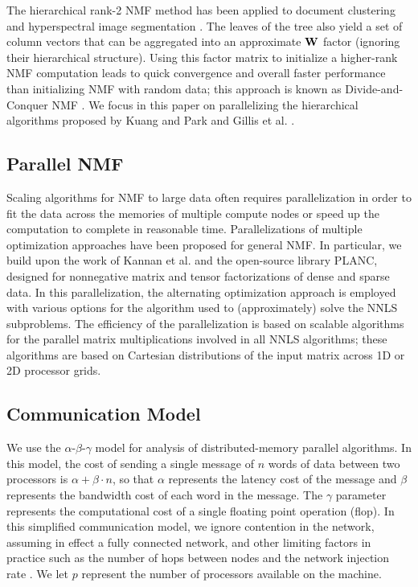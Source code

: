 \documentclass[conference,compsoc]{IEEEtran}
\begin{document}
The hierarchical rank-2 NMF method has been applied to document clustering \cite{KP13} and hyperspectral image segmentation \cite{GKP15}.
The leaves of the tree also yield a set of column vectors that can be aggregated into an approximate $\M{W}$ factor (ignoring their hierarchical structure).
Using this factor matrix to initialize a higher-rank NMF computation leads to quick convergence and overall faster performance than initializing NMF with random data; this approach is known as Divide-and-Conquer NMF \cite{DKDP17}.
We focus in this paper on parallelizing the hierarchical algorithms proposed by Kuang and Park \cite{KP13} and Gillis et al. \cite{GKP15}.

\subsection{Parallel NMF}


Scaling algorithms for NMF to large data often requires parallelization in order to fit the data across the memories of multiple compute nodes or speed up the computation to complete in reasonable time.
Parallelizations of multiple optimization approaches have been proposed for general NMF.
In particular, we build upon the work of Kannan et al. \cite{KBP16,KBP17,EH+19-TR} and the open-source library PLANC, designed for nonnegative matrix and tensor factorizations of dense and sparse data.
In this parallelization, the alternating optimization approach is employed with various options for the algorithm used to (approximately) solve the NNLS subproblems.
The efficiency of the parallelization is based on scalable algorithms for the parallel matrix multiplications involved in all NNLS algorithms; these algorithms are based on Cartesian distributions of the input matrix across 1D or 2D processor grids.

\subsection{Communication Model}

We use the $\alpha$-$\beta$-$\gamma$ model \cite{TRG05,CH+07,BCDH+14} for analysis of distributed-memory parallel algorithms. 
In this model, the cost of sending a single message of $n$ words of data between two processors is $\alpha + \beta \cdot n$, so that $\alpha$ represents the latency cost of the message and $\beta$ represents the bandwidth cost of each word in the message.
The $\gamma$ parameter represents the computational cost of a single floating point operation (flop).
In this simplified communication model, we ignore contention in the network, assuming in effect a fully connected network, and other limiting factors in practice such as the number of hops between nodes and the network injection rate \cite{GOS16}.
We let $p$ represent the number of processors available on the machine.
\end{document}
